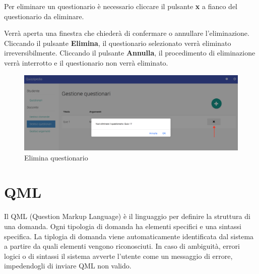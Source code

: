\documentclass[12pt,a4paper]{article}
\begin{document}
		\par Per eliminare un questionario è necessario cliccare il pulsante \textbf{x} a fianco del questionario da eliminare. \\
		\par Verrà aperta una finestra che chiederà di confermare o annullare l'eliminazione. Cliccando il pulsante \textbf{Elimina}, il questionario selezionato verrà eliminato irreversibilmente. Cliccando il pulsante \textbf{Annulla}, il procedimento di eliminazione verrà interrotto e il questionario non verrà eliminato. \\
		
		\begin{figure}[H]	
			\centering
			\includegraphics[width=\linewidth]{../img/screenshot/eliminaQuestionario.png}
			\caption{Elimina questionario}
			\label{Elimina questionario}
		\end{figure}
		

	
	\section{QML}
	\par Il QML (Question Markup Language) è il linguaggio per definire la struttura di una domanda. Ogni tipologia di domanda ha elementi specifici e una sintassi specifica. La tiplogia di domanda viene automaticamente identificata dal sistema a partire da quali elementi vengono riconosciuti. In caso di ambiguità, errori logici o di sintassi il sistema avverte l'utente come un messaggio di errore, impedendogli di inviare QML non valido. \\
		
\end{document}
